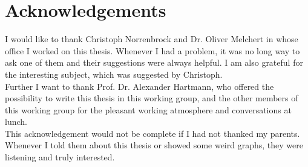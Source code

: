 \section*{Acknowledgements}
    I would like to thank Christoph Norrenbrock and Dr. Oliver Melchert
    in whose office I worked on this thesis. Whenever I had a problem,
    it was no long way to ask one of them and their suggestions were
    always helpful. I am also grateful for the interesting subject, which
    was suggested by Christoph.\\
    Further I want to thank Prof. Dr. Alexander Hartmann, who offered the
    possibility to write this thesis in this working group,
    and the other members of this working group for the pleasant working
    atmosphere and conversations at lunch.\\
    This acknowledgement would not be complete if I had not thanked my
    parents. Whenever I told them about this thesis or showed some weird
    graphs, they were listening and truly interested.
